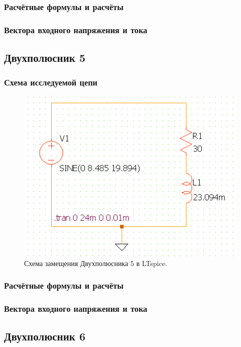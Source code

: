 \subsubsection{Расчётные формулы и расчёты}

\subsubsection{Вектора входного напряжения и тока}


\subsection{Двухполюсник 5}
\subsubsection{Схема исследуемой цепи}
\begin{figure}[H]
	\centering
	\includegraphics[width=1\textwidth]{./data/schema5}
	\caption{Схема замещения Двухполюсника 5 в LTspice.}
\end{figure}
\subsubsection{Расчётные формулы и расчёты}

\subsubsection{Вектора входного напряжения и тока}


\subsection{Двухполюсник 6}
